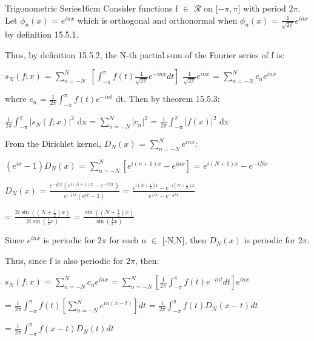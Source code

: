    \begin{definition}{Trigonometric Series}{16cm}
        Consider functions f $\in$ $\mathscr{R}$ on [$-\pi,\pi$] with period $2\pi$.
        Let $\phi_n(x)$ = $e^{inx}$ which is orthogonal and orthonormal
        when $\phi_n(x)$ = $\frac{1}{\sqrt{2\pi}} e^{inx}$
        by {\color{blue} definition 15.5.1}.
        
        Thus, by {\color{blue} definition 15.5.2},
        the N-th partial sum of the Fourier series of f is:

        \hspace{0.5cm}
        $s_N(f;x)$
        = $\sum_{n=-N}^N$
            $[\int_{-\pi}^{\pi} f(t) \frac{1}{\sqrt{2\pi}}e^{-inx} dt]$
            $\frac{1}{\sqrt{2\pi}} e^{inx}$
        = $\sum_{n=-N}^N c_ne^{inx}$

        where $c_n$ = $\frac{1}{2\pi} \int_{-\pi}^{\pi} f(t)e^{-int}$ dt.
        Then by {\color{red} theorem 15.5.3}:

        \hspace{0.5cm}
        $\frac{1}{2\pi} \int_{-\pi}^{\pi} |s_N(f;x)|^2$ dx
        = $\sum_{n=-N}^N |c_n|^2$
        = $\frac{1}{2\pi} \int_{-\pi}^{\pi} |f(x)|^2$ dx

        \vspace{0.2cm}

        From the Dirichlet kernel,
        $D_N(x)$ = $\sum_{n=-N}^N e^{inx}$:
        
        \hspace{0.5cm}
        $(e^{ix} - 1)D_N(x)$
        = $\sum_{n=-N}^N [e^{i(n+1)x} - e^{inx}]$
        = $e^{i(N+1)x} - e^{-iNx}$

        \hspace{0.5cm}
        $D_N(x)$
        = $\frac{e^{-\frac{1}{2}ix}(e^{i(N+1)x} - e^{-iNx})}
                {e^{-\frac{1}{2}ix}(e^{ix} - 1)}$
        = $\frac{e^{i(N+\frac{1}{2})x} - e^{-i(N+\frac{1}{2})x}}
                {e^{\frac{1}{2}ix} - e^{-\frac{1}{2}ix}}$
        
        \hspace{1.8cm}
        = $\frac{2i\sin((N+\frac{1}{2})x)}{2i\sin(\frac{1}{2}x)}$
        = $\frac{\sin((N+\frac{1}{2})x)}{\sin(\frac{1}{2}x)}$

        Since $e^{inx}$ is periodic for $2\pi$ for each n $\in$ [-N,N], then
        $D_N(x)$ is periodic for $2\pi$.

        Thus, since f is also periodic for $2\pi$, then:

        \hspace{0.5cm}
        $s_N(f;x)$
        = $\sum_{n=-N}^N c_ne^{inx}$
        = $\sum_{n=-N}^N [\frac{1}{2\pi} \int_{-\pi}^{\pi} f(t)e^{-int} dt] e^{inx}$

        \hspace{2.1cm}
        = $\frac{1}{2\pi} \int_{-\pi}^{\pi} f(t) [\sum_{n=-N}^N e^{in(x-t)}] dt$
        = $\frac{1}{2\pi} \int_{-\pi}^{\pi} f(t) D_N(x-t) dt$

        \hspace{2.1cm}
        = $\frac{1}{2\pi} \int_{-\pi}^{\pi} f(x-t) D_N(t) dt$
    \end{definition}

